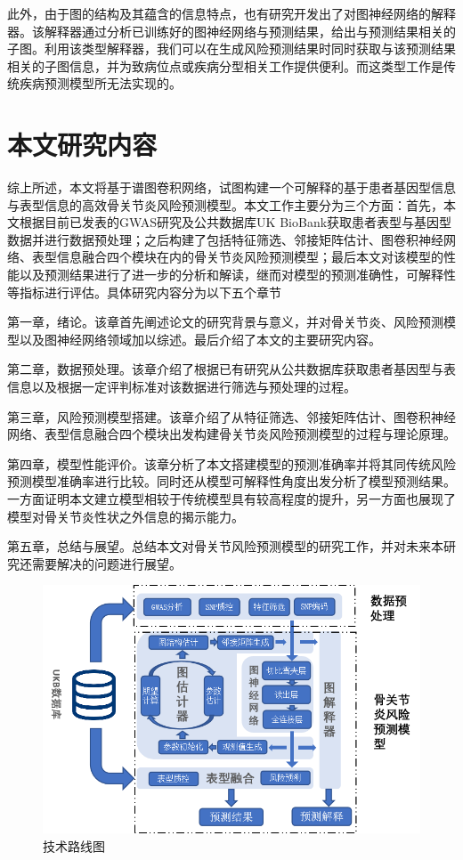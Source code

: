 此外，由于图的结构及其蕴含的信息特点，也有研究\cite{ying_gnnexplainer:_2019}开发出了对图神经网络的解释器。该解释器通过分析已训练好的图神经网络与预测结果，给出与预测结果相关的子图。利用该类型解释器，我们可以在生成风险预测结果时同时获取与该预测结果相关的子图信息，并为致病位点或疾病分型相关工作提供便利。而这类型工作是传统疾病预测模型所无法实现的。

\section{本文研究内容}
综上所述，本文将基于谱图卷积网络，试图构建一个可解释的基于患者基因型信息与表型信息的高效骨关节炎风险预测模型。本文工作主要分为三个方面：首先，本文根据目前已发表的GWAS研究及公共数据库UK BioBank获取患者表型与基因型数据并进行数据预处理；之后构建了包括特征筛选、邻接矩阵估计、图卷积神经网络、表型信息融合四个模块在内的骨关节炎风险预测模型；最后本文对该模型的性能以及预测结果进行了进一步的分析和解读，继而对模型的预测准确性，可解释性等指标进行评估。具体研究内容分为以下五个章节

第一章，绪论。该章首先阐述论文的研究背景与意义，并对骨关节炎、风险预测模型以及图神经网络领域加以综述。最后介绍了本文的主要研究内容。

第二章，数据预处理。该章介绍了根据已有研究从公共数据库获取患者基因型与表信息以及根据一定评判标准对该数据进行筛选与预处理的过程。

第三章，风险预测模型搭建。该章介绍了从特征筛选、邻接矩阵估计、图卷积神经网络、表型信息融合四个模块出发构建骨关节炎风险预测模型的过程与理论原理。

第四章，模型性能评价。该章分析了本文搭建模型的预测准确率并将其同传统风险预测模型准确率进行比较。同时还从模型可解释性角度出发分析了模型预测结果。一方面证明本文建立模型相较于传统模型具有较高程度的提升，另一方面也展现了模型对骨关节炎性状之外信息的揭示能力。

第五章，总结与展望。总结本文对骨关节风险预测模型的研究工作，并对未来本研究还需要解决的问题进行展望。


\begin{figure}[!ht]
	\centering
	\includegraphics[width=\textwidth]{./figures/Chapter1/Routine.png}
	\caption{技术路线图} \label{fig:Routine}
\end{figure}